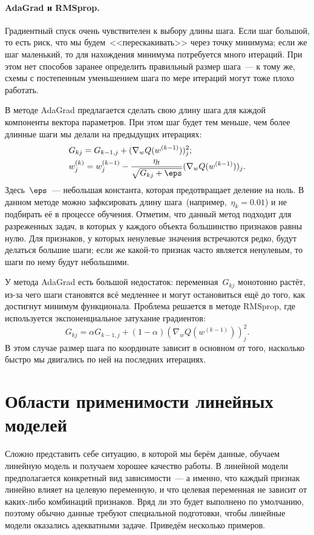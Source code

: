 \documentclass[12pt,fleqn]{article}
\begin{document}
\paragraph{AdaGrad и RMSprop.}
Градиентный спуск очень чувствителен к выбору длины шага.
Если шаг большой, то есть риск, что мы будем~<<перескакивать>> через точку минимума;
если же шаг маленький, то для нахождения минимума потребуется много итераций.
При этом нет способов заранее определить правильный размер шага~--- к тому же,
схемы с постепенным уменьшением шага по мере итераций могут тоже плохо работать.

В методе AdaGrad предлагается сделать свою длину шага для каждой компоненты вектора параметров.
При этом шаг будет тем меньше, чем более длинные шаги мы делали на предыдущих итерациях:
\begin{align*}
    &G_{kj} = G_{k-1,j} + (\nabla_w Q(w^{(k-1)}))_j^2;\\
    &w_j^{(k)} = w_j^{(k-1)} - \frac{\eta_t}{\sqrt{G_{kj} + \eps}} (\nabla_w Q(w^{(k-1)}))_j.
\end{align*}
Здесь~$\eps$~--- небольшая константа, которая предотвращает деление на ноль.
В данном методе можно зафксировать длину шага~(например,~$\eta_k = 0.01$)
и не подбирать её в процессе обучения.
Отметим, что данный метод подходит для разреженных задач, в которых у каждого объекта большинство признаков равны нулю.
Для признаков, у которых ненулевые значения встречаются редко, будут делаться большие шаги;
если же какой-то признак часто является ненулевым, то шаги по нему будут небольшими.

У метода AdaGrad есть большой недостаток: переменная~$G_{kj}$ монотонно растёт,
из-за чего шаги становятся всё медленнее и могут остановиться ещё до того,
как достигнут минимум функционала.
Проблема решается в методе RMSprop, где используется экспоненциальное затухание градиентов:
\[
    G_{kj} = \alpha G_{k-1,j} + (1 - \alpha) (\nabla_w Q(w^{(k-1)}))_j^2.
\]
В этом случае размер шага по координате зависит в основном от того, насколько
быстро мы двигались по ней на последних итерациях.






\section{Области применимости линейных моделей}

Сложно представить себе ситуацию, в которой мы берём данные, обучаем линейную модель и получаем хорошее качество работы.
В линейной модели предполагается конкретный вид зависимости~--- а именно, что каждый признак линейно влияет на целевую переменную,
и что целевая переменная не зависит от каких-либо комбинаций признаков.
Вряд ли это будет выполнено по умолчанию, поэтому обычно данные требуют специальной подготовки, чтобы линейные модели
оказались адекватными задаче.
Приведём несколько примеров.
\end{document}
